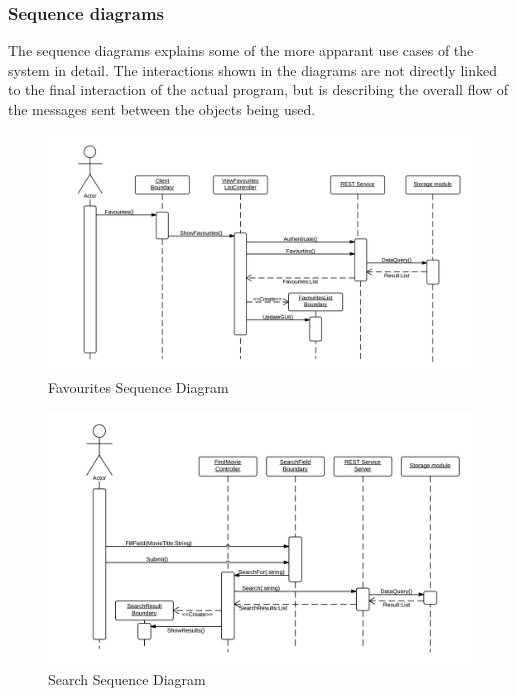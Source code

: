 \subsubsection{Sequence diagrams}

The sequence diagrams explains some of the more apparant use cases of the system in detail. The interactions shown in the diagrams are not directly linked to the final interaction of the actual program, but is describing the overall flow of the messages sent between the objects being used.

\begin{figure}[H]
\includegraphics[width=\linewidth]{img/FavouritesSequenceDiagram.png}
\caption{Favourites Sequence Diagram}
\label{fig:Favourites Sequence Diagram}
\end{figure}

\begin{figure}[H]
\includegraphics[width=\linewidth]{img/SearchSequenceDiagram.png}
\caption{Search Sequence Diagram}
\label{fig:Search Sequence Diagram}
\end{figure}

